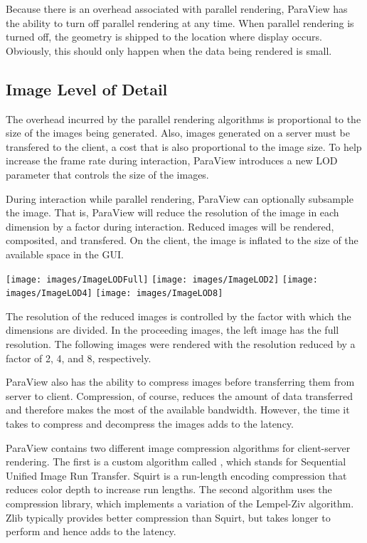 Because there is an overhead associated with parallel rendering, ParaView
has the ability to turn off parallel rendering at any time.  When parallel
rendering is turned off, the geometry is shipped to the location where
display occurs.  Obviously, this should only happen when the data being
rendered is small.

\subsection{Image Level of Detail}

The overhead incurred by the parallel rendering algorithms is proportional
to the size of the images being generated.  Also, images generated on a
server must be transfered to the client, a cost that is also proportional
to the image size.  To help increase the frame rate during interaction,
ParaView introduces a new LOD parameter that controls the size of the
images.

During interaction while parallel rendering, ParaView can optionally
subsample the image.  That is, ParaView will reduce the
resolution of the image in each dimension by a factor during interaction.
Reduced images will be rendered, composited, and transfered.  On the
client, the image is inflated to the size of the available space in the
GUI.

\begin{inlinefig}
  \texttt{[image: images/ImageLODFull]}
  \texttt{[image: images/ImageLOD2]}
  \texttt{[image: images/ImageLOD4]}
  \texttt{[image: images/ImageLOD8]}
\end{inlinefig}

The resolution of the reduced images is controlled by the factor with which
the dimensions are divided.  In the proceeding images, the left image has
the full resolution.  The following images were rendered with the
resolution reduced by a factor of 2, 4, and 8, respectively.

ParaView also has the ability to compress images before transferring them
from server to client. Compression, of course, reduces the amount of data
transferred and therefore makes the most of the available bandwidth.
However, the time it takes to compress and decompress the images adds to
the latency.

ParaView contains two different image compression algorithms for
client-server rendering. The first is a custom algorithm called
, which stands for Sequential Unified Image Run Transfer.
Squirt is a run-length encoding compression that reduces color depth to
increase run lengths. The second algorithm uses the 
compression library, which implements a variation of the Lempel-Ziv
algorithm. Zlib typically provides better compression than Squirt, but
takes longer to perform and hence adds to the latency.

